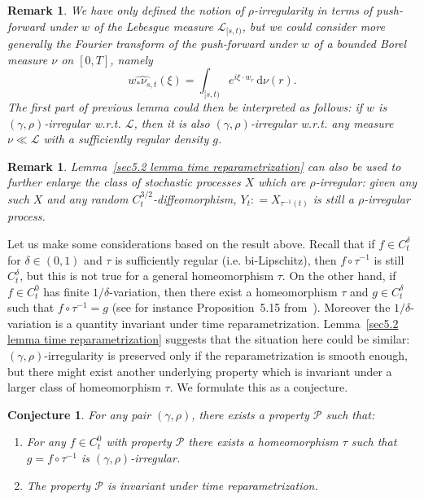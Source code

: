 \documentclass[10pt]{article}
\newcommand{\mathd}{\mathrm{d}}
\newtheorem{conjecture}[theorem]{Conjecture}
\newtheorem{remark}[theorem]{Remark}
\begin{document}
\begin{remark}
  We have only defined the notion of $\rho$\mbox{-}irregularity in terms of
  push-forward under $w$ of the Lebesgue measure $\mathcal{L}_{[s, t)}$, but
  we could consider more generally the Fourier transform of the push-forward
  under $w$ of a bounded Borel measure $\nu$ on $[0, T]$, namely
  \[ \widehat{w_{\ast} \nu_{s, t}} (\xi) = \int_{[s, t)} e^{i \xi \cdot w_r}
     \, \mathd \nu (r) . \]
  The first part of previous lemma could then be interpreted as follows: if
  $w$ is $(\gamma, \rho)$\mbox{-}irregular w.r.t. $\mathcal{L}$, then it is
  also $(\gamma, \rho)$\mbox{-}irregular w.r.t. any measure $\nu \ll
  \mathcal{L}$ with a sufficiently regular density $g$.
\end{remark}

\begin{remark}
  Lemma~\ref{sec5.2 lemma time reparametrization} can also be used to further
  enlarge the class of stochastic processes $X$ which are
  $\rho$\mbox{-}irregular: given any such $X$ and any random $C^{3 /
  2}_t$\mbox{-}diffeomorphism, $Y_t : = X_{\tau^{- 1} (t)}$ is still a
  $\rho$\mbox{-}irregular process.
\end{remark}

Let us make some considerations based on the result above. Recall that if $f
\in C^{\delta}_t$ for $\delta \in (0, 1)$ and $\tau$ is sufficiently regular
(i.e. bi\mbox{-}Lipschitz), then $f \circ \tau^{- 1}$ is still $C^{\delta}_t$,
but this is not true for a general homeomorphism $\tau$. On the other hand, if
$f \in C^0_t$ has finite $1 / \delta$\mbox{-}variation, then there exist a
homeomorphism $\tau$ and $g \in C^{\delta}_t$ such that $f \circ \tau^{- 1} =
g$ (see for instance Proposition~5.15 from~{\cite{frizvictoir}}). Moreover the
$1 / \delta$\mbox{-}variation is a quantity invariant under time
reparametrization. Lemma~\ref{sec5.2 lemma time reparametrization} suggests
that the situation here could be similar: $(\gamma, \rho)$\mbox{-}irregularity
is preserved only if the reparametrization is smooth enough, but there might
exist another underlying property which is invariant under a larger class of
homeomorphism $\tau$. We formulate this as a conjecture.

\begin{conjecture}
  \label{conj:rho}For any pair $(\gamma, \rho)$, there exists a property
  $\mathcal{P}$ such that:
  \begin{enumerate}[label=\arabic*.]
    \item For any $f \in C^0_t$ with property $\mathcal{P}$ there exists a
    homeomorphism $\tau$ such that $g = f \circ \tau^{- 1}$ is $(\gamma,
    \rho)$\mbox{-}irregular.
    
    \item The property $\mathcal{P}$ is invariant under time
    reparametrization.
  \end{enumerate}
\end{conjecture}
\end{document}
